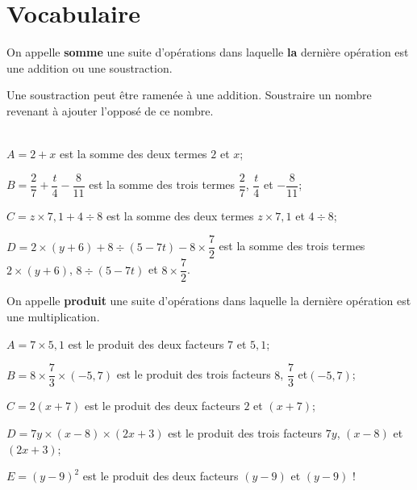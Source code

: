 \section{Vocabulaire}
\begin{definition}
    On appelle {\bfseries somme} une suite d'opérations dans laquelle {\bfseries la} dernière opération est une addition ou une soustraction.
\end{definition}

\begin{remarque}
    Une soustraction peut être ramenée à une addition. Soustraire un nombre revenant à ajouter l'opposé de ce nombre.
\end{remarque}

\begin{exemples*1}
    \phantom{rrr}\\    
    $A= 2+x$ est la somme des deux termes $2$ et $x$;
    
    \medskip
    $B=\dfrac{2}{7}+\dfrac{t}{4}-\dfrac{8}{11}$ est la somme des trois termes $\dfrac{2}{7}$, $\dfrac{t}{4}$ et $-\dfrac{8}{11}$;

    \medskip
    $C=z\times 7,1 + 4\div 8$ est la somme des deux termes $z\times 7,1$ et $4\div 8$;

    \medskip
    $D=2\times (y + 6) + 8\div (5 - 7t) - 8\times \dfrac{7}{2}$ est la somme des trois termes $2\times (y + 6)$, $8\div (5 - 7t)$ et $8\times \dfrac{7}{2}$.    
\end{exemples*1}

\begin{definition}
On appelle {\bfseries produit} une suite d'opérations dans laquelle la dernière opération est une multiplication.
\end{definition}

\begin{exemples*1}
    \phantom{rrr}

    $A=7\times 5,1$ est le produit des deux facteurs $7$ et $5,1$;

    \medskip
    $B=8\times \dfrac{7}{3} \times (-5,7)$ est le produit des trois facteurs $8$, $\dfrac{7}{3}$ et$(-5,7)$;

    \medskip
    $C=2(x+7)$ est le produit des deux facteurs $2$ et $(x+7)$;

    \medskip
    $D=7y\times (x-8)\times (2x+3)$ est le produit des trois facteurs $7y$, $(x-8)$ et $(2x+3)$;

    \medskip
    $E=(y-9)^{2}$ est le produit des deux facteurs $(y-9)$ et $(y-9)$ !
\end{exemples*1}

